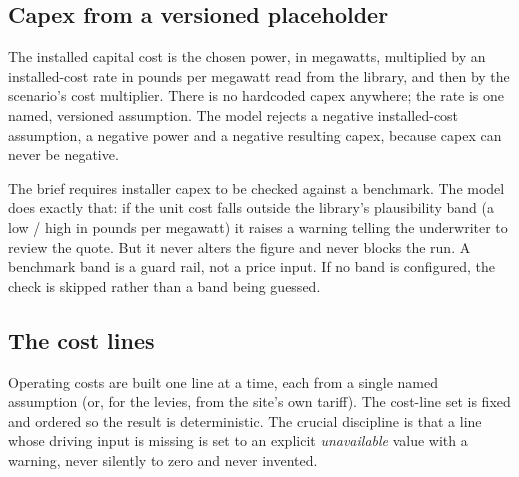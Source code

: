 \subsection{Capex from a versioned placeholder}

The installed capital cost is the chosen power, in megawatts, multiplied by an installed-cost rate in pounds per megawatt read from the library, and then by the scenario's cost multiplier. There is no hardcoded capex anywhere; the rate is one named, versioned assumption. The model rejects a negative installed-cost assumption, a negative power and a negative resulting capex, because capex can never be negative.

\begin{caution}
The brief requires installer capex to be checked against a benchmark. The model does exactly that: if the unit cost falls outside the library's plausibility band (a low / high in pounds per megawatt) it raises a warning telling the underwriter to review the quote. But it never alters the figure and never blocks the run. A benchmark band is a guard rail, not a price input. If no band is configured, the check is skipped rather than a band being guessed.
\end{caution}

\subsection{The cost lines}

Operating costs are built one line at a time, each from a single named assumption (or, for the levies, from the site's own tariff). The cost-line set is fixed and ordered so the result is deterministic. The crucial discipline is that a line whose driving input is missing is set to an explicit \emph{unavailable} value with a warning, never silently to zero and never invented.

